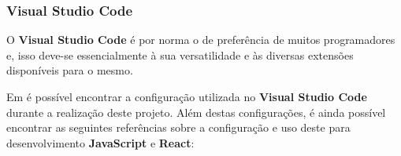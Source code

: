 \subsubsection{Visual Studio Code}

\begin{minipage}{.3\textwidth}
\end{minipage}
\begin{minipage}{.7\textwidth}
	\minipagerestore
	O \textbf{Visual Studio Code} é por norma o  de preferência de muitos programadores e, isso deve-se essencialmente à sua versatilidade e às diversas extensões disponíveis para o mesmo.

	Em  é possível encontrar a configuração utilizada no \textbf{Visual Studio Code} durante a realização deste projeto. Além destas configurações, é ainda possível encontrar as seguintes referências sobre a configuração e uso deste  para desenvolvimento \textbf{JavaScript} e \textbf{React}: \cite{ultimateVSReact,reactToolsVS,spVSExtensions,vscodeReactSP}
\end{minipage}